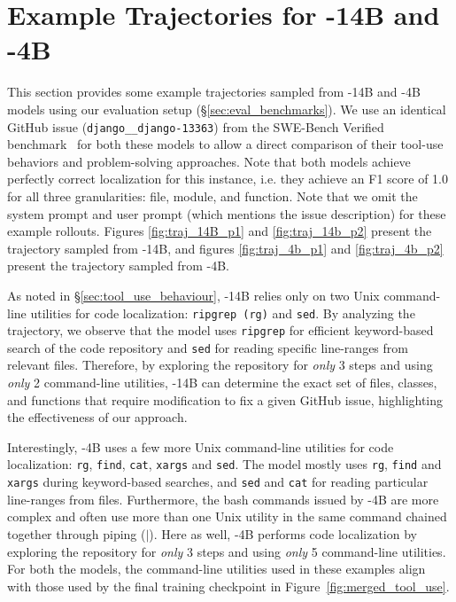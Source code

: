 \section{Example Trajectories for \methodname-14B and \methodname-4B}\label{appendix:traj_examples}
This section provides some example trajectories sampled from \methodname-14B and \methodname-4B models using our evaluation setup (\S\ref{sec:eval_benchmarks}). We use an identical GitHub issue (\texttt{django\_\_django-13363}) from the SWE-Bench Verified benchmark~\citep{chowdhury2024swebenchverified} for both these models to allow a direct comparison of their tool-use behaviors and problem-solving approaches. Note that both models achieve  perfectly correct localization for this instance, i.e. they achieve an F1 score of 1.0 for all three granularities: file, module, and function. Note that we omit the system prompt and user prompt (which mentions the issue description) for these example rollouts. Figures \ref{fig:traj_14B_p1} and \ref{fig:traj_14b_p2} present the trajectory sampled from \methodname-14B, and figures \ref{fig:traj_4b_p1} and \ref{fig:traj_4b_p2} present the trajectory sampled from \methodname-4B.

As noted in \S\ref{sec:tool_use_behaviour}, \methodname-14B relies only on two Unix command-line utilities for code localization: \texttt{ripgrep (rg)} and \texttt{sed}. By analyzing the trajectory, we observe that the model uses \texttt{ripgrep} for efficient keyword-based search of the code repository and \texttt{sed} for reading specific line-ranges from relevant files. Therefore, by exploring the repository for \emph{only} 3 steps and using \emph{only} 2 command-line utilities, \methodname-14B can determine the exact set of files, classes, and functions that require modification to fix a given GitHub issue, highlighting the effectiveness of our approach.

Interestingly, \methodname-4B uses a few more Unix command-line utilities for code localization: \texttt{rg}, \texttt{find}, \texttt{cat}, \texttt{xargs} and \texttt{sed}. The model mostly uses \texttt{rg}, \texttt{find} and \texttt{xargs} during keyword-based searches, and \texttt{sed} and \texttt{cat} for reading particular line-ranges from files. Furthermore, the bash commands issued by \methodname-4B are more complex and often use more than one Unix utility in the same command chained together through piping ($|$). Here as well, \methodname-4B performs code localization by exploring the repository for \emph{only} 3 steps and using \emph{only} 5 command-line utilities. For both the models, the command-line utilities used in these examples align with those used by the final training checkpoint in Figure~\ref{fig:merged_tool_use}.


